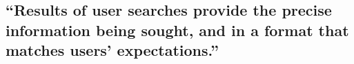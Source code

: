 \documentclass{article}
\begin{document}
\subsection{“Results of user searches provide the precise information being sought, and in a format that matches users’ expectations.”}



\pagebreak
%
%
\end{document}
